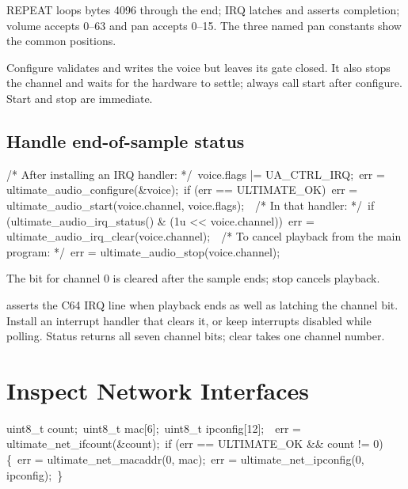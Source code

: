 \begin{resultbox}
REPEAT loops bytes 4096 through the end; IRQ latches and asserts completion;
volume accepts 0--63 and pan accepts 0--15. The three named pan constants show
the common positions.
\end{resultbox}

Configure validates and writes the voice but leaves its gate closed. It also
stops the channel and waits for the hardware to settle; always call start
after configure. Start and stop are immediate.

\subsection*{Handle end-of-sample status}

\begin{listingbox}
/* After installing an IRQ handler: */\
voice.flags |= UA\_CTRL\_IRQ;\
err = ultimate\_audio\_configure(\&voice);\
if (err == ULTIMATE\_OK)\
\hspace*{1em}err = ultimate\_audio\_start(voice.channel, voice.flags);\
\
/* In that handler: */\
if (ultimate\_audio\_irq\_status() \& (1u << voice.channel))\
\hspace*{1em}err = ultimate\_audio\_irq\_clear(voice.channel);\
\
/* To cancel playback from the main program: */\
err = ultimate\_audio\_stop(voice.channel);
\end{listingbox}

\begin{resultbox}
The bit for channel 0 is cleared after the sample ends; stop cancels playback.
\end{resultbox}

\cmd{UA\_CTRL\_IRQ} asserts the C64 IRQ line when playback ends as well as
latching the channel bit. Install an interrupt handler that clears it, or keep
interrupts disabled while polling. Status returns all seven channel bits;
clear takes one channel number.


\section{Inspect Network Interfaces}

\begin{listingbox}
uint8\_t count;\
uint8\_t mac[6];\
uint8\_t ipconfig[12];\
\
err = ultimate\_net\_ifcount(\&count);\
if (err == ULTIMATE\_OK \&\& count != 0) \{\
\hspace*{1em}err = ultimate\_net\_macaddr(0, mac);\
\hspace*{1em}err = ultimate\_net\_ipconfig(0, ipconfig);\
\}
\end{listingbox}

